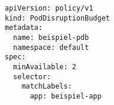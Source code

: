 \begin{verbatim}
apiVersion: policy/v1
kind: PodDisruptionBudget
metadata:
  name: beispiel-pdb
  namespace: default
spec:
  minAvailable: 2
  selector:
    matchLabels:
      app: beispiel-app
\end{verbatim}